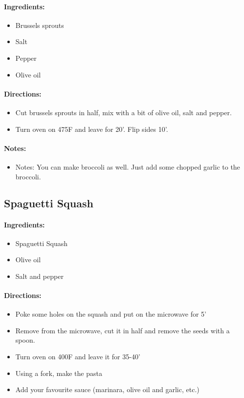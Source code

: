 \documentclass{article}
\begin{document}
\paragraph{Ingredients:}
\begin{itemize}
    \item Brussels sprouts
    \item Salt
    \item Pepper
    \item Olive oil
\end{itemize}

\paragraph{Directions:}
\begin{itemize}
    \item Cut brussels sprouts in half, mix with a bit of olive oil, salt and pepper.
    \item Turn oven on 475F and leave for 20'. Flip sides 10'.
\end{itemize}

\paragraph{Notes:}
\begin{itemize}
    \item Notes: You can make broccoli as well. Just add some chopped garlic to the broccoli.
\end{itemize}

\subsection{Spaguetti Squash}

\paragraph{Ingredients:}
\begin{itemize}
    \item Spaguetti Squash
    \item Olive oil
    \item Salt and pepper
\end{itemize}

\paragraph{Directions:}
\begin{itemize}
    \item Poke some holes on the squash and put on the microwave for 5'
    \item Remove from the microwave, cut it in half and remove the seeds with a spoon.
    \item Turn oven on 400F and leave it for 35-40'
    \item Using a fork, make the pasta
    \item Add your favourite sauce (marinara, olive oil and garlic, etc.)
\end{itemize}
\end{document}
